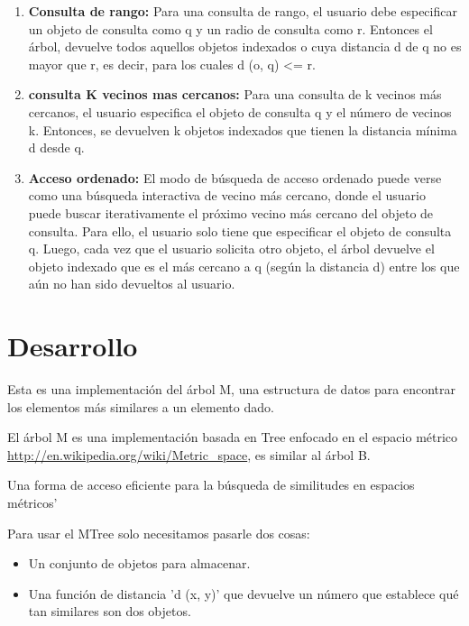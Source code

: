 \documentclass[a4paper]{article}
\begin{document}
\begin{enumerate}
    \item \textbf{Consulta de rango:}
     Para una consulta de rango, el usuario debe especificar un objeto de consulta como q y un radio de consulta como  r. Entonces el árbol, devuelve todos aquellos objetos indexados o cuya distancia d de q no es mayor que r, es decir, para los cuales d (o, q) <= r.
     
     \item \textbf{consulta K vecinos mas cercanos:}
      Para una consulta de k vecinos más cercanos, el usuario especifica el objeto de consulta q y el número de vecinos k. Entonces, se devuelven k objetos indexados que tienen la distancia mínima d desde q.
      
      \item \textbf{Acceso ordenado:}  El modo de búsqueda de acceso ordenado puede verse como una búsqueda interactiva de vecino más cercano, donde el usuario puede buscar iterativamente el próximo vecino más cercano del objeto de consulta. Para ello, el usuario solo tiene que especificar el objeto de consulta q. Luego, cada vez que el usuario solicita otro objeto, el árbol devuelve el objeto indexado que es el más cercano a q (según la distancia d) entre los que aún no han sido devueltos al usuario\cite{pag}.
\end{enumerate}


\section{Desarrollo}


Esta es una implementación del árbol M, una estructura de datos para encontrar los elementos más similares a un elemento dado.

El árbol M es una implementación basada en Tree enfocado en el   espacio métrico
\url{http://en.wikipedia.org/wiki/Metric_space}, es similar al árbol B.

 Una forma  de acceso eficiente para la búsqueda de similitudes en espacios métricos'

Para usar el  MTree solo necesitamos pasarle dos cosas:
\begin{itemize}
    \item Un conjunto de objetos para almacenar.
    
    \item Una función de distancia 'd (x, y)' que devuelve un número que establece
qué tan similares son dos objetos.
\end{itemize}
\end{document}
